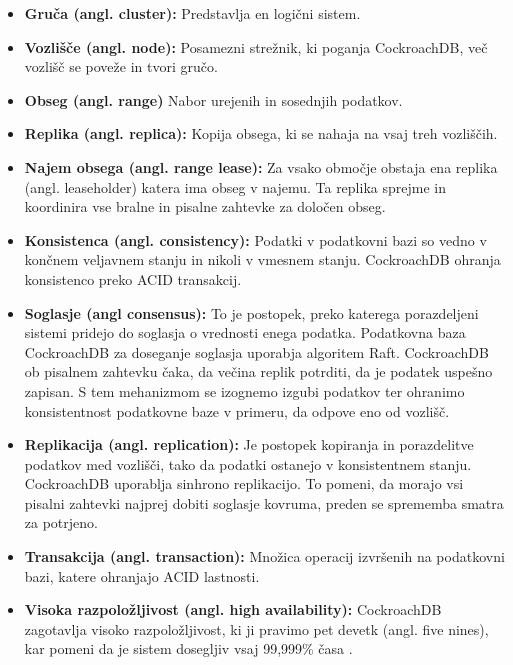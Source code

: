 \documentclass[a4paper, 12pt]{book}
\begin{document}
\begin{itemize}
    \item \textbf{Gruča (angl. cluster):} Predstavlja en logični sistem. 
    \item \textbf{Vozlišče (angl. node):} Posamezni strežnik, ki poganja Cock\-roach\-DB, več vozlišč se poveže in tvori gručo.
    \item \textbf{Obseg (angl. range)} Nabor urejenih in sosednjih podatkov.
    \item \textbf{Replika (angl. replica):} Kopija obsega, ki se nahaja na vsaj treh vozliščih.
    \item \textbf{Najem obsega (angl. range lease):} Za vsako območje obstaja ena replika (angl. leaseholder) katera ima obseg v najemu. Ta replika sprejme in koordinira vse bralne in pisalne zahtevke za določen obseg.
    \item \textbf{Konsistenca (angl. consistency):} Podatki v podatkovni bazi so vedno v končnem veljavnem stanju in nikoli v vmesnem stanju. Cock\-roach\-DB ohranja konsistenco preko ACID transakcij.
    \item \textbf{Soglasje (angl consensus):} To je postopek, preko katerega porazdeljeni sistemi pridejo do soglasja o vrednosti enega podatka. Podatkovna baza CockroachDB za doseganje soglasja uporabja algoritem Raft. Cock\-roach\-DB ob pisalnem zahtevku čaka, da večina replik potrditi, da je podatek uspešno zapisan. S tem mehanizmom se izognemo izgubi podatkov ter ohranimo konsistentnost podatkovne baze v primeru, da odpove eno od vozlišč.
    \item \textbf{Replikacija (angl. replication):} Je postopek kopiranja in porazdelitve podatkov med vozlišči, tako da podatki ostanejo v konsistentnem stanju. Cock\-roach\-DB uporablja sinhrono replikacijo. To pomeni, da morajo vsi pisalni zahtevki najprej dobiti soglasje kovruma, preden se sprememba smatra za potrjeno.
    \item \textbf{Transakcija (angl. transaction):} Množica operacij izvršenih na podatkovni bazi, katere ohranjajo ACID lastnosti.
    \item \textbf{Visoka razpoložljivost (angl. high availability):} CockroachDB zagotavlja visoko razpoložljivost, ki ji pravimo pet devetk (angl. five nines), kar pomeni da je sistem dosegljiv vsaj 99,999\% časa \cite{CRDB-FAQ}.
\end{itemize}
\end{document}
